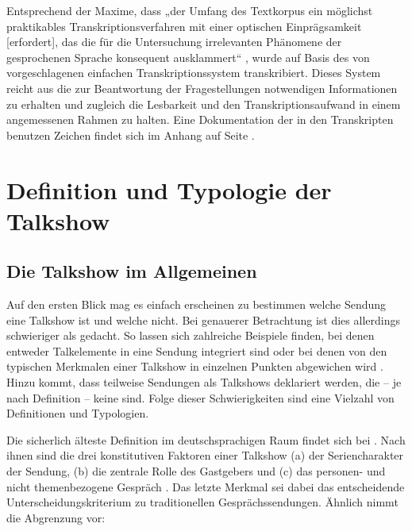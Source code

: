 Entsprechend der Maxime, dass „der Umfang des Textkorpus ein möglichst praktikables Transkriptionsverfahren mit einer optischen Einprägsamkeit [erfordert], das die für  die Untersuchung irrelevanten Phänomene der gesprochenen Sprache konsequent ausklammert“ \parencites[81]{hoffmannPolitischeFernsehinterviewsEmpirische1982}[vgl. auch][169-174]{biereVerstehenUndBeschreiben1994}, wurde auf Basis des von \textcite[18-23]{dresingPraxisbuchTranskriptionRegelsysteme2011} vorgeschlagenen einfachen Transkriptionssystem transkribiert. Dieses System reicht aus die zur Beantwortung der Fragestellungen notwendigen Informationen zu erhalten und zugleich die Lesbarkeit und den Transkriptionsaufwand in einem angemessenen Rahmen zu halten. Eine Dokumentation der in den Transkripten benutzen Zeichen findet sich im Anhang auf Seite \pageref{chap:transkriptionsregeln}.

\section{Definition und Typologie der Talkshow}

\subsection{Die Talkshow im Allgemeinen}

Auf den ersten Blick mag es einfach erscheinen zu bestimmen welche Sendung eine Talkshow ist und welche nicht. Bei genauerer Betrachtung ist dies allerdings schwieriger als gedacht. So lassen sich zahlreiche Beispiele finden, bei denen entweder Talkelemente in eine Sendung integriert sind oder bei denen von den typischen Merkmalen einer Talkshow in einzelnen Punkten abgewichen wird \parencite[14]{kellerGeschichteTalkshowDeutschland2009}. Hinzu kommt, dass teilweise Sendungen als Talkshows deklariert werden, die – je nach Definition –  keine sind. Folge dieser Schwierigkeiten sind eine Vielzahl von Definitionen und Typologien.

Die sicherlich älteste Definition im deutschsprachigen Raum findet sich bei \textcite{barloewenGespraechMitGaesten1975}. Nach ihnen sind die drei konstitutiven Faktoren einer Talkshow (a) der Seriencharakter der Sendung, (b) die zentrale Rolle des Gastgebers und (c) das personen- und nicht themenbezogene Gespräch \parencite[18]{barloewenGespraechMitGaesten1975}. Das letzte Merkmal sei dabei das entscheidende Unterscheidungskriterium zu traditionellen Gesprächssendungen. Ähnlich nimmt \textcite[16]{hoeferTalkMenschlich1975} die Abgrenzung vor:

